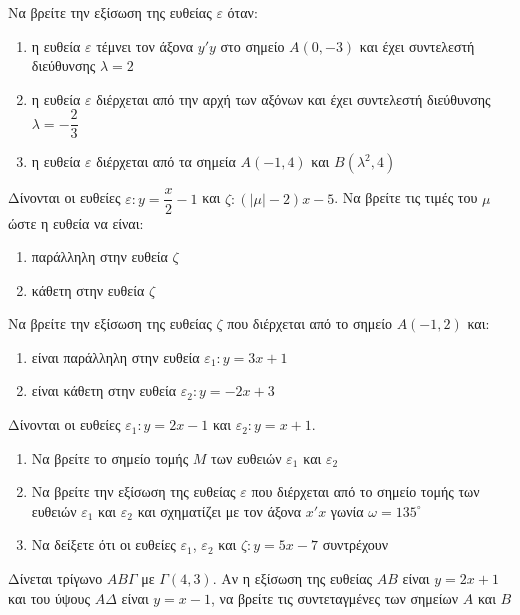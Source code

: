 \documentclass{presentation}
\begin{document}
\begin{askisi}
  Να βρείτε την εξίσωση της ευθείας $ε$ όταν:
  \begin{enumerate}[<+->]
    \item η ευθεία $ε$ τέμνει τον άξονα $y'y$ στο σημείο $Α(0,-3)$ και έχει συντελεστή διεύθυνσης $λ=2$
    \item η ευθεία $ε$ διέρχεται από την αρχή των αξόνων και έχει συντελεστή διεύθυνσης $λ=-\dfrac{2}{3}$
    \item η ευθεία $ε$ διέρχεται από τα σημεία $Α(-1,4)$ και $Β(λ^2,4)$
  \end{enumerate}
\end{askisi}

\begin{askisi}
  Δίνονται οι ευθείες $ε:y=\dfrac{x}{2}-1$ και $ζ:(|μ|-2)x-5$. Να βρείτε τις τιμές του $μ$ ώστε η ευθεία να είναι:
  \begin{enumerate}[<+->]
    \item παράλληλη στην ευθεία $ζ$
    \item κάθετη στην ευθεία $ζ$
  \end{enumerate}
\end{askisi}

\begin{askisi}
  Να βρείτε την εξίσωση της ευθείας $ζ$ που διέρχεται από το σημείο $Α(-1,2)$ και:
  \begin{enumerate}[<+->]
    \item είναι παράλληλη στην ευθεία $ε_1:y=3x+1$
    \item είναι κάθετη στην ευθεία $ε_2:y=-2x+3$
  \end{enumerate}
\end{askisi}

\begin{askisi}
  Δίνονται οι ευθείες $ε_1:y=2x-1$ και $ε_2:y=x+1$.
  \begin{enumerate}[<+->]
    \item Να βρείτε το σημείο τομής $Μ$ των ευθειών $ε_1$ και $ε_2$
    \item Να βρείτε την εξίσωση της ευθείας $ε$ που διέρχεται από το σημείο τομής των ευθειών $ε_1$ και $ε_2$ και σχηματίζει με τον άξονα $x'x$ γωνία $ω=135^{\circ}$
    \item Να δείξετε ότι οι ευθείες $ε_1$, $ε_2$ και $ζ:y=5x-7$ συντρέχουν
  \end{enumerate}
\end{askisi}

\begin{askisi}
  Δίνεται τρίγωνο $ΑΒΓ$ με $Γ(4,3)$. Αν η εξίσωση της ευθείας $ΑΒ$ είναι $y=2x+1$ και του ύψους $ΑΔ$ είναι $y=x-1$, να βρείτε τις συντεταγμένες των σημείων $Α$ και $Β$
\end{askisi}
\end{document}
